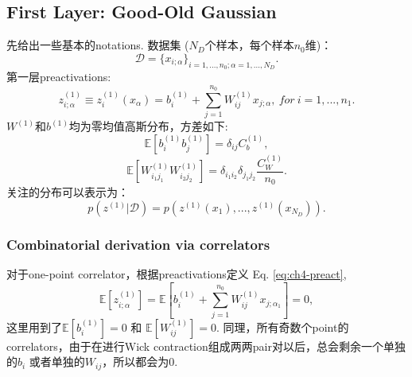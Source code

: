 \subsection{First Layer: Good-Old Gaussian}
先给出一些基本的notations. 数据集 ($N_D$个样本，每个样本$n_0$维)：
\begin{equation}
    \mathcal{D} = \{x_{i;\alpha}\}_{i=1,...,n_0;\alpha=1,...,N_D}.
\end{equation}
第一层preactivations:
\begin{equation}
    z_{i;\alpha}^{(1)} \equiv z_i^{(1)}(x_\alpha) = b_i^{(1)} + 
        \sum_{j=1}^{n_0}W_{ij}^{(1)}x_{j;\alpha},~ for ~ i = 1,...,n_1.
    \label{eq:ch4-preact}
\end{equation}
$W^{(1)}$和$b^{(1)}$均为零均值高斯分布，方差如下:
\begin{equation}
    \mathbb{E}\left[b_i^{(1)}b_j^{(1)}\right] = \delta_{ij}C_b^{(1)},
    \label{eq:ch4_var_b}
\end{equation}
\begin{equation}
    \mathbb{E}\left[W_{i_1j_1}^{(1)}W_{i_2j_2}^{(1)}\right] = 
        \delta_{i_1i_2}\delta_{j_1j_2}\frac{C_W^{(1)}}{n_0}.
    \label{eq:ch4_var_w}
\end{equation}
关注的分布可以表示为：
\begin{equation}
    p(z^{(1)}|\mathcal{D}) = p(z^{(1)}(x_1),...,z^{(1)}(x_{N_D})).
\end{equation}

\subsubsection{Combinatorial derivation via correlators}
对于one-point correlator，根据preactivations定义 Eq. \ref{eq:ch4-preact},
\begin{equation}
    \mathbb{E}\left[z_{i;\alpha}^{(1)}\right] = 
        \mathbb{E}\left[b_i^{(1)} + \sum_{j=1}^{n_0}W_{ij}^{(1)}x_{j;\alpha_1}\right]
        = 0,
\end{equation}
这里用到了$\mathbb{E}\left[b_i^{(1)}\right] =0$ 和 $\mathbb{E}\left[W_{ij}^{(1)}\right] =0$.
同理，所有奇数个point的correlators，由于在进行Wick contraction组成两两pair对以后，总会剩余一个单独的$b_i$
或者单独的$W_{ij}$，所以都会为$0$.

